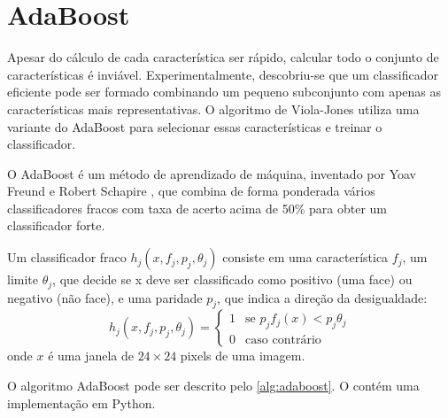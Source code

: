 \section{AdaBoost}\label{sec:adaboost}

Apesar do cálculo de cada característica ser rápido, calcular todo o conjunto de características é inviável. Experimentalmente, descobriu-se que um classificador eficiente pode ser formado combinando um pequeno subconjunto com apenas as características mais representativas. O algoritmo de Viola-Jones utiliza uma variante do AdaBoost para selecionar essas características e treinar o classificador.

O AdaBoost é um método de aprendizado de máquina, inventado por Yoav Freund e Robert Schapire \cite{freund1997decision}, que combina de forma ponderada vários classificadores fracos com taxa de acerto acima de 50\% para obter um classificador forte.

Um classificador fraco $h_{j}(x,f_{j},p_{j},\theta_{j})$ consiste em uma característica $f_{j}$, um limite $\theta_{j}$, que decide se x deve ser classificado como positivo (uma face) ou negativo (não face), e uma paridade $p_{j}$, que indica a direção da desigualdade:
%
\begin{equation} \label{eq:weak_classifier}
    h_{j}(x,f_{j},p_{j},\theta_{j}) = 
    \begin{cases}
        1 & \text{se } p_{j}f_{j}(x) < p_{j}\theta_{j}\\
        0 & \text{caso contrário}
    \end{cases}
\end{equation}
%
onde $x$ é uma janela de $24\times24$ pixels de uma imagem.

O algoritmo AdaBoost pode ser descrito pelo \autoref{alg:adaboost}. O  contém uma implementação em Python.

